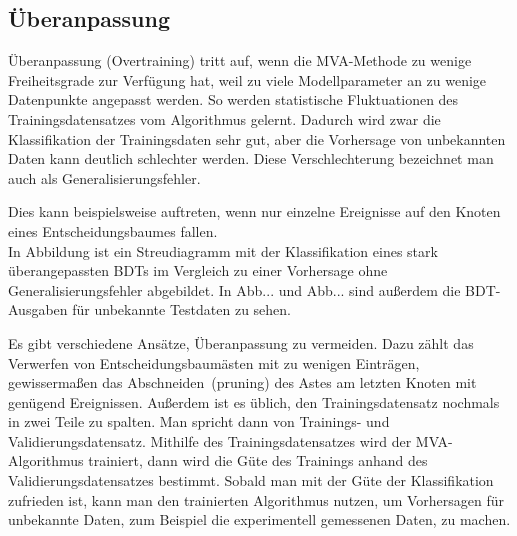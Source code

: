 

\subsection{\"Uberanpassung}
\label{ch:Algorithmen:subsec:overtraining}

\"Uberanpassung (Overtraining) tritt auf, wenn die MVA-Methode zu wenige Freiheitsgrade zur Verf\"ugung hat, weil zu viele Modellparameter an zu wenige Datenpunkte angepasst werden. So werden statistische Fluktuationen des Trainingsdatensatzes vom Algorithmus gelernt. Dadurch wird zwar die Klassifikation der Trainingsdaten sehr gut, aber die Vorhersage von unbekannten Daten kann deutlich schlechter werden. Diese Verschlechterung bezeichnet man auch als Generalisierungsfehler.

Dies kann beispielsweise auftreten, wenn nur einzelne Ereignisse auf den Knoten eines Entscheidungsbaumes fallen.\\
In Abbildung  ist ein Streudiagramm mit der Klassifikation eines stark \"uberangepassten BDTs im Vergleich zu einer Vorhersage ohne Generalisierungsfehler abgebildet. In Abb... und Abb...  sind au\ss erdem die BDT-Ausgaben f\"ur unbekannte Testdaten zu sehen.

Es gibt verschiedene Ans\"atze, \"Uberanpassung zu vermeiden. Dazu z\"ahlt das Verwerfen von Entscheidungsbaum\"asten mit zu wenigen Eintr\"agen, gewisserma\ss en das \glqq Abschneiden\grqq~(pruning) des Astes am letzten Knoten mit gen\"ugend Ereignissen. Au\ss erdem ist es \"ublich, den Trainingsdatensatz nochmals in zwei Teile zu spalten. Man spricht dann von Trainings- und Validierungsdatensatz. Mithilfe des Trainingsdatensatzes wird der MVA-Algorithmus trainiert, dann wird die G\"ute des Trainings anhand des Validierungsdatensatzes bestimmt. Sobald man mit der G\"ute der Klassifikation zufrieden ist, kann man den trainierten Algorithmus nutzen, um Vorhersagen f\"ur unbekannte Daten, zum Beispiel die experimentell gemessenen Daten, zu machen.

